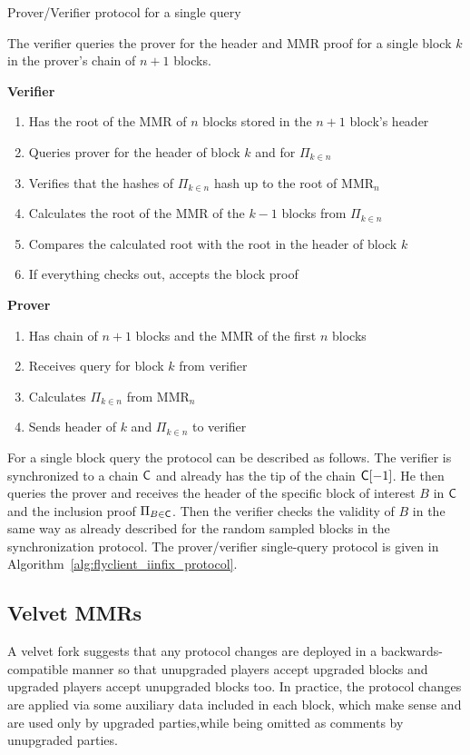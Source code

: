 	\begin{algorithm}[h!]
		\caption{\label{alg:flyclient_iinfix_protocol}Prover/Verifier protocol for a single query~\cite{flyclient}}
		The verifier queries the prover for the header and MMR proof for a single block $k$ in the prover's chain of $n+1$ blocks.
		\begin{center}
			\textbf{Verifier}
		\end{center}
		\begin{enumerate}
			\item Has the root of the MMR of $n$ blocks stored in the $n+1$ block's header 
			\item Queries prover for the header of block $k$ and for $\Pi_{k \in n}$
			\item Verifies that the hashes of $\Pi_{k \in n}$ hash up to the root of MMR$_n$
			\item Calculates the root of the MMR of the $k-1$ blocks from $\Pi_{k \in n}$ 
			\item Compares the calculated root with the root in the header of block $k$
			\item If everything checks out, accepts the block proof
		\end{enumerate}
		\begin{center}
			\textbf{Prover}
		\end{center}
		\begin{enumerate}
			\item Has chain of $n+1$ blocks and the MMR of the first $n$ blocks 
			\item Receives query for block $k$ from verifier 
			\item Calculates $\Pi_{k \in n}$ from MMR$_n$
			\item Sends header of $k$ and $\Pi_{k \in n}$ to verifier
		\end{enumerate}
	\end{algorithm}

	For a single block query the protocol can be described as follows. The verifier is synchronized to a chain $\mathsf{C}$ and already has the tip of the chain $\mathsf{C}[-1]$. He then queries the prover and receives the header of the specific block of interest $B$ in $\mathsf{C}$ and the inclusion proof $\Pi_{B \in \mathsf{C}}$. Then the verifier checks the validity of $B$ in the same way as already described for the random sampled blocks in the synchronization protocol. 
	The prover/verifier single-query protocol is given in Algorithm~\ref{alg:flyclient_iinfix_protocol}.


\subsection{Velvet MMRs}
	A velvet fork suggests that any protocol changes are deployed in a backwards-compatible manner so that unupgraded players accept upgraded blocks and upgraded players accept unupgraded blocks too. In practice, the protocol changes are applied via some auxiliary data included in each block, which make sense and are used only by upgraded parties,while being omitted as comments by unupgraded parties. 

